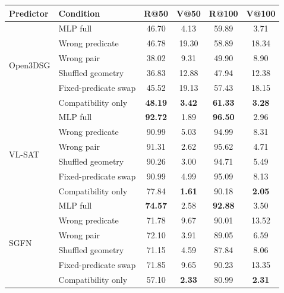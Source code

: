 \begin{minipage}{\textwidth}
\centering
{\small
\setlength{\tabcolsep}{4pt}
\begin{tabular}{llcccc}
\toprule
Predictor & Condition & R@50 & V@50 & R@100 & V@100 \\
\midrule
\multirow{6}{*}{Open3DSG}
& MLP full & 46.70 & 4.13 & 59.89 & 3.71 \\
& Wrong predicate & 46.78 & 19.30 & 58.89 & 18.34 \\
& Wrong pair & 38.02 & 9.31 & 49.90 & 8.90 \\
& Shuffled geometry & 36.83 & 12.88 & 47.94 & 12.38 \\
& Fixed-predicate swap & 45.52 & 19.13 & 57.43 & 18.15 \\
& Compatibility only & \textbf{48.19} & \textbf{3.42} & \textbf{61.33} & \textbf{3.28} \\
\midrule
\multirow{6}{*}{VL-SAT}
& MLP full & \textbf{92.72} & 1.89 & \textbf{96.50} & 2.96 \\
& Wrong predicate & 90.99 & 5.03 & 94.99 & 8.31 \\
& Wrong pair & 91.31 & 2.62 & 95.62 & 4.71 \\
& Shuffled geometry & 90.26 & 3.00 & 94.71 & 5.49 \\
& Fixed-predicate swap & 90.99 & 4.99 & 95.09 & 8.13 \\
& Compatibility only & 77.84 & \textbf{1.61} & 90.18 & \textbf{2.05} \\
\midrule
\multirow{6}{*}{SGFN}
& MLP full & \textbf{74.57} & 2.58 & \textbf{92.88} & 3.50 \\
& Wrong predicate & 71.78 & 9.67 & 90.01 & 13.52 \\
& Wrong pair & 72.10 & 3.91 & 89.05 & 6.59 \\
& Shuffled geometry & 71.15 & 4.59 & 87.84 & 8.06 \\
& Fixed-predicate swap & 71.85 & 9.65 & 90.23 & 13.35 \\
& Compatibility only & 57.10 & \textbf{2.33} & 80.99 & \textbf{2.31} \\
\bottomrule
\end{tabular}
}
\label{tab:ablations-k50}
\vspace{0.20\baselineskip}


\end{minipage}

